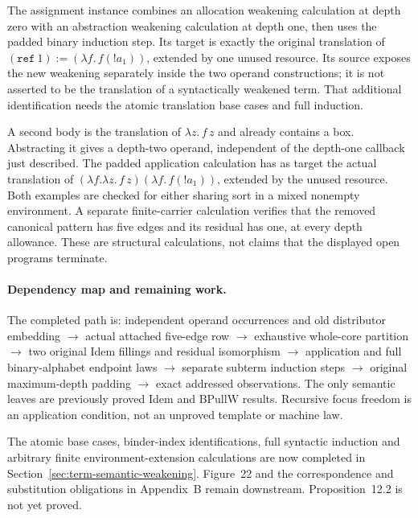 The assignment instance combines an allocation weakening calculation at
depth zero with an abstraction weakening calculation at depth one, then
uses the padded binary induction step. Its target is exactly the original
translation of $(\mathtt{ref}\ 1):=(\lambda f.\,f(!a_1))$, extended by one
unused resource. Its source exposes the new weakening separately inside
the two operand constructions; it is not asserted to be the translation
of a syntactically weakened term. That additional identification needs the
atomic translation base cases and full induction.

A second body is the translation of $\lambda z.\,f\,z$ and already contains
a box. Abstracting it gives a depth-two operand, independent of the depth-one
callback just described. The padded application calculation has as target
the actual translation of
$(\lambda f.\lambda z.\,f\,z)(\lambda f.\,f(!a_1))$, extended by the unused
resource. Both examples are checked for either sharing sort in a mixed
nonempty environment. A separate finite-carrier calculation verifies that
the removed canonical pattern has five edges and its residual has one,
at every depth allowance. These are structural calculations, not claims
that the displayed open programs terminate.

\paragraph{Dependency map and remaining work.}
The completed path is: independent operand occurrences and old distributor
embedding $\to$ actual attached five-edge row $\to$ exhaustive whole-core
partition $\to$ two original Idem fillings and residual isomorphism
$\to$ application and full binary-alphabet endpoint laws $\to$ separate
subterm induction steps $\to$ original maximum-depth padding $\to$ exact
addressed observations. The only semantic leaves are previously proved
Idem and BPullW results. Recursive focus freedom is an application condition,
not an unproved template or machine law.

The atomic base cases, binder-index identifications, full syntactic induction
and arbitrary finite environment-extension calculations are now completed in
Section~\ref{sec:term-semantic-weakening}. Figure~22 and the correspondence and
substitution obligations in Appendix~B remain downstream. Proposition~12.2
is not yet proved.
